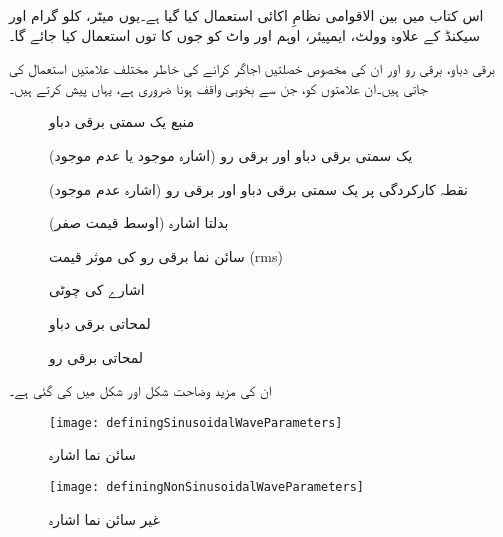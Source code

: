 
اس کتاب میں بین الاقوامی نظامِ اکائی  استعمال کیا گیا ہے۔یوں میٹر، کلو گرام اور سیکنڈ کے علاوہ وولٹ، ایمپیئر، اوہم اور واٹ کو جوں کا توں استعمال کیا جائے گا۔

برقی دباو، برقی رو اور ان کی مخصوص خصلتیں اجاگر کرانے کی خاطر مختلف علامتیں استعمال کی جاتی ہیں۔ان علامتوں کو، جن سے بخوبی واقف ہونا ضروری ہے، یہاں پیش کرتے ہیں۔

\begin{description}
\item
[]  منبع یک سمتی برقی دباو
\item
[] یک سمتی برقی دباو اور برقی رو  (اشارہ موجود یا عدم موجود)
\item
[]  نقطہ کارکردگی پر یک سمتی برقی دباو اور برقی رو (اشارہ عدم موجود)
\item
[] بدلتا اشارہ (اوسط قیمت صفر)
\item
[ ]  سائن نما برقی رو کی موثر قیمت (rms)
\item
[ ]  اشارے کی چوٹی
\item
[ ] لمحاتی برقی دباو
\item
[ ] لمحاتی برقی رو
\end{description}

\FloatBarrier

ان کی مزید وضاحت شکل   اور شکل  میں کی گئی ہے۔

\begin{figure}
\centering
\texttt{[image: definingSinusoidalWaveParameters]}
\caption{سائن نما اشارہ}
\label{شکل_سائن_نما_اشارے_کے_جزو}
\end{figure}

\begin{figure}
\centering
\texttt{[image: definingNonSinusoidalWaveParameters]}
\caption{غیر سائن نما اشارہ}
\label{شکل_غیر_سائن_نما_اشارے_کے_جزو}
\end{figure}

\FloatBarrier



